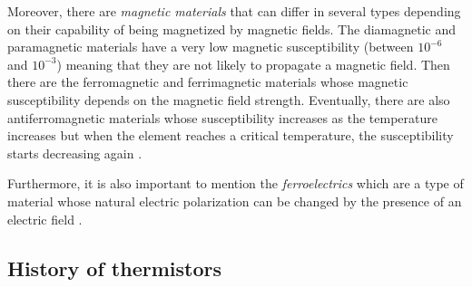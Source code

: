 Moreover, there are \textsl{magnetic materials} that can differ in several types depending on their capability of being magnetized by magnetic fields. The diamagnetic and paramagnetic materials have a very low magnetic susceptibility (between $10^{-6}$ and $10^{-3}$) meaning that they are not likely to propagate a magnetic field. Then there are the ferromagnetic and ferrimagnetic materials whose magnetic susceptibility depends on the magnetic field strength. Eventually, there are also antiferromagnetic materials whose susceptibility increases as the temperature increases but when the element reaches a critical temperature, the susceptibility starts decreasing again \cite{Gupta20163}\cite{heck2013magnetic}.

Furthermore, it is also important to mention the \textsl{ferroelectrics} which are a type of material whose natural electric polarization can be changed by the presence of an electric field \cite{Gupta20163}\cite{whatmore2017ferroelectric}.

\subsection{History of thermistors}

